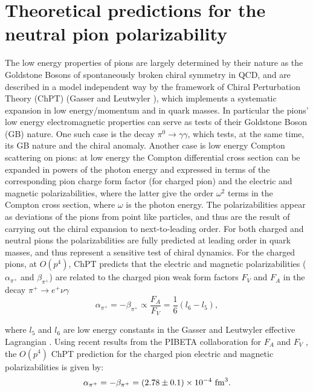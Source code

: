 \section{Theoretical predictions for the neutral pion polarizability}
The low energy properties of pions are largely determined by  their nature as
the Goldstone Bosons of spontaneously broken chiral symmetry in QCD,
and are described in a model independent way by the framework of
Chiral Perturbation Theory (ChPT) (Gasser and Leutwyler
\cite{Gasser:1983yg}), which implements a systematic expansion in low
energy/momentum and in quark masses.  In particular the pions' low
energy electromagnetic properties can serve as tests of their
Goldstone Boson (GB) nature. One such case is the decay
$\pi^0\to\gamma\gamma$, which tests, at the same time, its GB nature and
the chiral anomaly. Another case is low energy Compton scattering on
pions: at low energy the Compton differential cross section can be
expanded in powers of the photon energy and expressed in terms of the
corresponding pion charge form factor (for charged pion) and the electric
and magnetic
polarizabilities, where the latter give the order $\omega^2$ terms in
the Compton cross section, where $\omega$ is the photon energy. The
polarizabilities appear as deviations
of the pions from point like particles, and thus are the result of carrying
out the chiral expansion to next-to-leading order. For both
charged and neutral pions the polarizabilities are fully predicted at
leading order in quark masses, and thus represent a sensitive test of
chiral dynamics. For the charged pions, at $O(p^4)$, ChPT predicts that
the electric and magnetic polarizabilities ($\alpha_{\pi^+}$ and
$\beta_{\pi^+}$) are related to the charged pion weak form factors
$F_V$ and $F_A$ in the decay $\pi^+ \rightarrow e^+ \nu \gamma$
\begin{equation}\label{alpha_and_beta}
\alpha_{\pi^+} = -\beta_{\pi^+} \propto \frac{F_A}{F_V} = \frac{1}{6} ( l_6 - l_5 ),
\end{equation}

\noindent where $l_5$ and $l_6$ are low energy constants in the Gasser
and Leutwyler effective Lagrangian \cite{Gasser:1983yg}.  Using recent
results from the PIBETA collaboration for $F_A$ and $F_V$
\cite{Bychkov:2008ws}, the $O(p^4)$ ChPT prediction for the charged
pion electric and magnetic polarizabilities is given by:
\begin{equation}\label{one_loop}
\alpha_{\pi^+} = -\beta_{\pi^+} = (2.78 \pm 0.1) \times 10^{-4}~{\rm fm}^3.
\end{equation}

